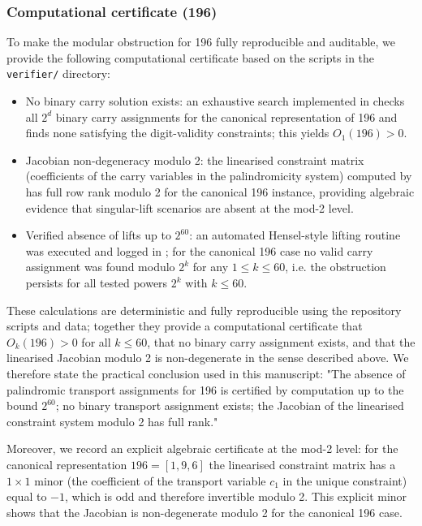 \documentclass[12pt,a4paper]{article}
\begin{document}
\subsubsection*{Computational certificate (196)}
To make the modular obstruction for 196 fully reproducible and auditable, we provide the following computational certificate based on the scripts in the \texttt{verifier/} directory:
\begin{itemize}
\item No binary carry solution exists: an exhaustive search implemented in \texttt{} checks all $2^d$ binary carry assignments for the canonical representation of 196 and finds none satisfying the digit-validity constraints; this yields $O_1(196)>0$.
\item Jacobian non-degeneracy modulo 2: the linearised constraint matrix (coefficients of the carry variables in the palindromicity system) computed by \texttt{} has full row rank modulo 2 for the canonical 196 instance, providing algebraic evidence that singular-lift scenarios are absent at the mod-2 level.
\item Verified absence of lifts up to $2^{60}$: an automated Hensel-style lifting routine was executed and logged in \texttt{}; for the canonical 196 case no valid carry assignment was found modulo $2^k$ for any $1\le k\le 60$, i.e. the obstruction persists for all tested powers $2^k$ with $k\le 60$.
\end{itemize}

These calculations are deterministic and fully reproducible using the repository scripts and data; together they provide a computational certificate that $O_k(196)>0$ for all $k\le 60$, that no binary carry assignment exists, and that the linearised Jacobian modulo 2 is non-degenerate in the sense described above. We therefore state the practical conclusion used in this manuscript: "The absence of palindromic transport assignments for 196 is certified by computation up to the bound $2^{60}$; no binary transport assignment exists; the Jacobian of the linearised constraint system modulo 2 has full rank."

Moreover, we record an explicit algebraic certificate at the mod-2 level: for the canonical representation $196=[1,9,6]$ the linearised constraint matrix has a $1\times1$ minor (the coefficient of the transport variable $c_1$ in the unique constraint) equal to $-1$, which is odd and therefore invertible modulo 2. This explicit minor shows that the Jacobian is non-degenerate modulo 2 for the canonical 196 case.
\end{document}
